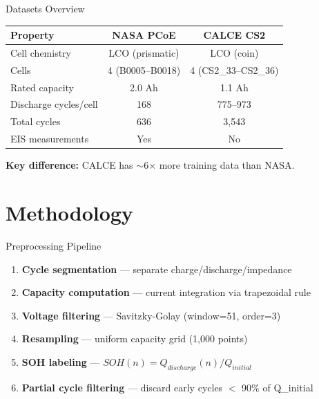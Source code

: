 \documentclass[aspectratio=169,11pt]{beamer}
\begin{document}
\begin{frame}{Datasets Overview}
\begin{table}[H]
\centering
\small
\begin{tabular}{lcc}
\toprule
\textbf{Property} & \textbf{NASA PCoE} & \textbf{CALCE CS2} \\
\midrule
Cell chemistry & LCO (prismatic) & LCO (coin) \\
Cells & 4 (B0005--B0018) & 4 (CS2\_33--CS2\_36) \\
Rated capacity & 2.0 Ah & 1.1 Ah \\
Discharge cycles/cell & 168 & 775--973 \\
Total cycles & 636 & 3,543 \\
EIS measurements & Yes & No \\
\bottomrule
\end{tabular}
\end{table}
\vspace{0.5em}
\textbf{Key difference:} CALCE has $\sim$6$\times$ more training data than NASA.
\end{frame}

\section{Methodology}

\begin{frame}{Preprocessing Pipeline}
\begin{enumerate}[nosep]
    \item \textbf{Cycle segmentation} --- separate charge/discharge/impedance
    \item \textbf{Capacity computation} --- current integration via trapezoidal rule
    \item \textbf{Voltage filtering} --- Savitzky-Golay (window=51, order=3)
    \item \textbf{Resampling} --- uniform capacity grid (1,000 points)
    \item \textbf{SOH labeling} --- $SOH(n) = Q_{discharge}(n) / Q_{initial}$
    \item \textbf{Partial cycle filtering} --- discard early cycles $<$ 90\% of Q\_initial
\end{enumerate}
\end{frame}
\end{document}
